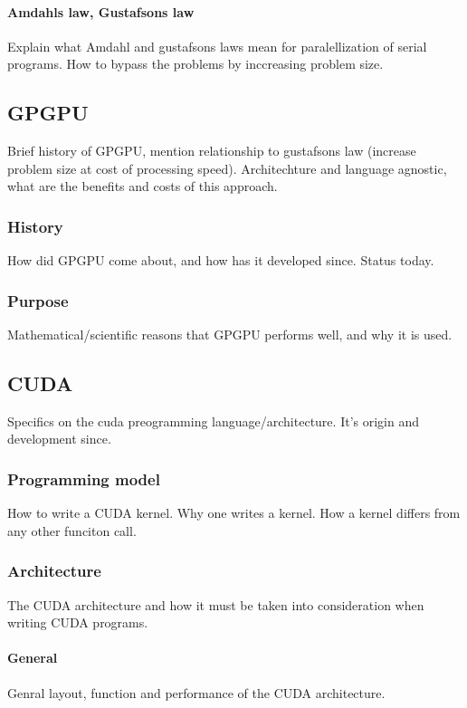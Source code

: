 \paragraph{Amdahls law, Gustafsons law}
Explain what Amdahl and gustafsons laws mean for paralellization of serial
programs. How to bypass the problems by inccreasing problem size.


\subsection{GPGPU}
Brief history of GPGPU, mention relationship to gustafsons law (increase
problem size at cost of processing speed). Architechture and language agnostic,
what are the benefits and costs of this approach.

\subsubsection{History}
How did GPGPU come about, and how has it developed since. Status today.

\subsubsection{Purpose}
Mathematical/scientific reasons that GPGPU performs well, and why it is used.

\subsection{CUDA}
Specifics on the cuda preogramming language/architecture. It's origin and
development since.

\subsubsection{Programming model}
How to write a CUDA kernel. Why one writes a kernel. How a kernel differs from
any other funciton call.

\subsubsection{Architecture}
The CUDA architecture and how it must be taken into consideration when writing
CUDA programs.
\paragraph{General}
Genral layout, function and performance of the CUDA architecture.
